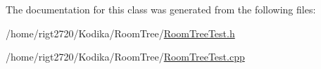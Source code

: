 The documentation for this class was generated from the following files\-:\begin{DoxyCompactItemize}
\item 
/home/rigt2720/\-Kodika/\-Room\-Tree/\hyperlink{RoomTreeTest_8h}{Room\-Tree\-Test.\-h}\item 
/home/rigt2720/\-Kodika/\-Room\-Tree/\hyperlink{RoomTreeTest_8cpp}{Room\-Tree\-Test.\-cpp}\end{DoxyCompactItemize}
